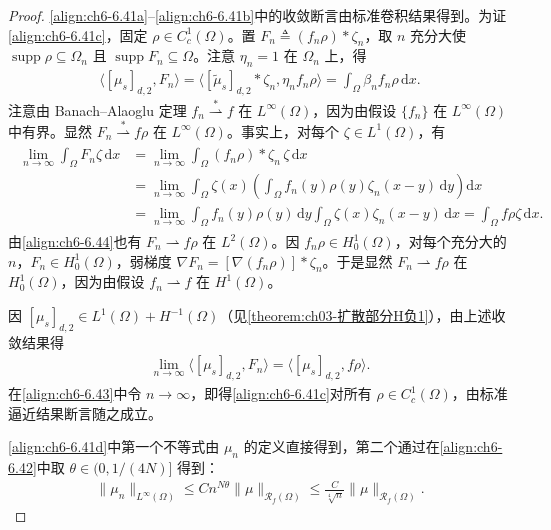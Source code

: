 \documentclass[../../main.tex]{subfiles}%
\begin{document}
\begin{proof}
\eqref{align:ch6-6.41a}--\eqref{align:ch6-6.41b}中的收敛断言由标准卷积结果得到。为证\eqref{align:ch6-6.41c}，固定 $\rho\in C^1_c(\Omega)$。置 $F_n\triangleq (f_n\rho)*\zeta_n$，取 $n$ 充分大使 $\operatorname{supp}\rho\subseteq\Omega_n$ 且 $\operatorname{supp}F_n\subseteq\Omega$。注意 $\eta_n=1$ 在 $\Omega_n$ 上，得
\begin{align}
\langle[\mu_s]_{d,2},F_n\rangle
=\langle[\widetilde\mu_s]_{d,2}*\zeta_n,\eta_n f_n\rho\rangle
=\int_\Omega\beta_n f_n\rho\,\mathrm{d}x. \label{align:ch6-6.43}
\end{align}
注意由 Banach--Alaoglu 定理 $f_n\stackrel{*}{\rightharpoonup}f$ 在 $L^\infty(\Omega)$，因为由假设 $\{f_n\}$ 在 $L^\infty(\Omega)$ 中有界。显然 $F_n\stackrel{*}{\rightharpoonup}f\rho$ 在 $L^\infty(\Omega)$。事实上，对每个 $\zeta\in L^1(\Omega)$，有
\begin{align}
\begin{aligned}
\lim_{n\to\infty}\int_\Omega F_n\zeta\,\mathrm{d}x
&=\lim_{n\to\infty}\int_\Omega(f_n\rho)*\zeta_n\,\zeta\,\mathrm{d}x\\
&=\lim_{n\to\infty}\int_\Omega\zeta(x)\left(\int_\Omega f_n(y)\rho(y)\zeta_n(x-y)\,\mathrm{d}y\right)\mathrm{d}x\\
&=\lim_{n\to\infty}\int_\Omega f_n(y)\rho(y)\,\mathrm{d}y\int_\Omega\zeta(x)\zeta_n(x-y)\,\mathrm{d}x
=\int_\Omega f\rho\zeta\,\mathrm{d}x.
\end{aligned} \label{align:ch6-6.44}
\end{align}
由\eqref{align:ch6-6.44}也有 $F_n\rightharpoonup f\rho$ 在 $L^2(\Omega)$。因 $f_n\rho\in H^1_0(\Omega)$，对每个充分大的 $n$，$F_n\in H^1_0(\Omega)$，弱梯度 $\nabla F_n=[\nabla(f_n\rho)]*\zeta_n$。于是显然 $F_n\rightharpoonup f\rho$ 在 $H^1_0(\Omega)$，因为由假设 $f_n\rightharpoonup f$ 在 $H^1(\Omega)$。

因 $[\mu_s]_{d,2}\in L^1(\Omega)+H^{-1}(\Omega)$（见\cref{theorem:ch03-扩散部分H负1}），由上述收敛结果得
\begin{align*}
\lim_{n\to\infty}\langle[\mu_s]_{d,2},F_n\rangle=\langle[\mu_s]_{d,2},f\rho\rangle.
\end{align*}
在\eqref{align:ch6-6.43}中令 $n\to\infty$，即得\eqref{align:ch6-6.41c}对所有 $\rho\in C^1_c(\Omega)$，由标准逼近结果断言随之成立。

\eqref{align:ch6-6.41d}中第一个不等式由 $\mu_n$ 的定义直接得到，第二个通过在\eqref{align:ch6-6.42}中取 $\theta\in(0,1/(4N)]$ 得到：
\begin{align*}
\|\mu_n\|_{L^\infty(\Omega)}\leqslant Cn^{N\theta}\|\mu\|_{\mathscr{R}_f(\Omega)}
\leqslant\frac{C}{\sqrt[4]{n}}\|\mu\|_{\mathscr{R}_f(\Omega)}.
\end{align*}


\end{proof}
\end{document}
